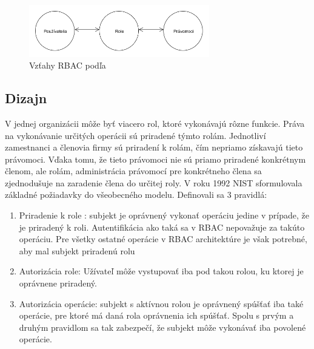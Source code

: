 \begin{figure}[H]
	\centerline{\includegraphics[width=0.7\textwidth]{images/rbac_kuhn}}
	\caption{Vzťahy RBAC podľa \cite{kuhn}}
	\label{obr:rbac_kuhn}
\end{figure}



\subsection{Dizajn}
V jednej organizácii môže byť viacero rol, ktoré vykonávajú rôzne funkcie. Práva na vykonávanie určitých operácii sú priradené týmto rolám. Jednotliví zamestnanci a členovia firmy sú priradení k rolám, čím nepriamo získavajú tieto právomoci.	Vďaka tomu, že tieto právomoci nie sú priamo priradené konkrétnym členom, ale rolám, administrácia právomocí pre konkrétneho člena sa zjednodušuje na zaradenie člena do určitej roly.
V roku 1992 NIST sformulovala základné požiadavky do všeobecného modelu.
Definovali sa 3  pravidlá:
\begin{enumerate}
		\item Priradenie k role : subjekt je oprávnený vykonať operáciu jedine v prípade, že je priradený k roli. Autentifikácia ako taká sa v RBAC nepovažuje za takúto operáciu. Pre všetky ostatné operácie v RBAC architektúre je však potrebné, aby mal subjekt priradenú rolu
		\item Autorizácia role: Užívateľ môže vystupovať iba pod takou rolou, ku ktorej je oprávnene priradený.
		\item Autorizácia operácie: subjekt s aktívnou rolou je oprávnený spúšťať iba také operácie, pre ktoré má daná rola oprávnenia ich spúšťať. Spolu s prvým a druhým pravidlom sa tak zabezpečí, že subjekt môže vykonávať iba povolené operácie.
\end{enumerate}

